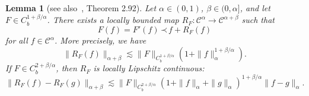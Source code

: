 \documentclass[a4paper,11pt]{article}
\newtheorem{lemma}[theorem]{Lemma}
\theoremstyle{remark}
\newcommand{\CC}{\ensuremath{\mathscr{C}}}
\newcommand{\lpara}{\,\mathord{\prec}\,}
\begin{document}
\begin{lemma}[see also~\cite{Bahouri2011}, Theorem 2.92]\label{lemma:paralinearization}
  Let $\alpha \in (0,1)$, $\beta \in (0,\alpha]$, and let $F \in C^{1+\beta/\alpha}_b$. There exists a locally bounded map $R_{F} \colon  \CC^{\alpha} \rightarrow \CC^{\alpha+\beta}$ such that
  \begin{equation}\label{eq:para-linearization}
    F ( f ) =F' ( f ) \lpara f+R_{F} ( f )
  \end{equation}
  for all $f \in \CC^{\alpha}$. More precisely, we have
  \[
     \| R_{F} ( f ) \|_{\alpha + \beta} \lesssim \|F\|_{C^{1+\beta/\alpha}_b} (1 + \| f \|_{\alpha}^{1+\beta/\alpha}).
  \]
  If $F \in C_b^{2+\beta/\alpha}$, then $R_{F}$ is locally Lipschitz continuous:
  \[
     \| R_{F} ( f ) -R_{F} ( g ) \|_{\alpha + \beta} \lesssim \|F\|_{C^{2+\beta/\alpha}_b} ( 1+ \| f \|_{\alpha} + \| g \|_{\alpha})^{1+\beta/\alpha} \| f - g \|_\alpha.
  \]
\end{lemma}
\end{document}
